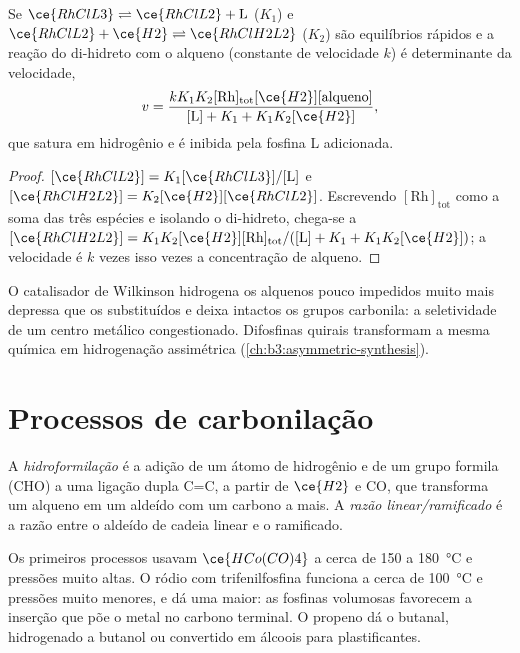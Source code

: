 \begin{proposition}\label{prop:b3:homogeneous-catalysis:wilkinson-rate}
Se $\ce{RhClL3} \rightleftharpoons \ce{RhClL2} + \mathrm L$ ($K_1$) e $\ce{RhClL2} + \ce{H2} \rightleftharpoons \ce{RhClH2L2}$ ($K_2$) são equilíbrios
rápidos e a reação do di-hidreto com o alqueno (constante de velocidade $k$)
é determinante da velocidade,
\[
  v = \frac{kK_1K_2[\mathrm{Rh}]_{\mathrm{tot}}[\ce{H2}][\text{alqueno}]}{[\mathrm L] + K_1 + K_1K_2[\ce{H2}]},
\]
que satura em hidrogênio e é inibida pela fosfina L adicionada.
\end{proposition}

\begin{proof}
$[\ce{RhClL2}] = K_1[\ce{RhClL3}]/[\mathrm L]$ e $[\ce{RhClH2L2}] = K_2[\ce{H2}][\ce{RhClL2}]$. Escrevendo $[\mathrm{Rh}]_{\mathrm{tot}}$ como a
soma das três espécies e isolando o di-hidreto, chega-se a
$[\ce{RhClH2L2}] =
K_1K_2[\ce{H2}][\mathrm{Rh}]_{\mathrm{tot}}/([\mathrm L] + K_1 + K_1K_2[\ce{H2}])$; a velocidade é $k$ vezes isso vezes a
concentração de alqueno.
\end{proof}

O catalisador de Wilkinson hidrogena os alquenos pouco impedidos muito mais depressa que os
substituídos e deixa intactos os grupos carbonila: a seletividade de um
centro metálico congestionado. Difosfinas quirais transformam a mesma química em
hidrogenação assimétrica (\cref{ch:b3:asymmetric-synthesis}).

\section{Processos de carbonilação}

\begin{definition}[Hidroformilação]\label{def:b3:homogeneous-catalysis:hydroformylation}
A \emph{hidroformilação} é a adição de um átomo de hidrogênio
e de um grupo formila (CHO) a uma ligação dupla C=C, a partir de $\ce{H2}$ e CO, que transforma um
alqueno em um aldeído com um carbono a mais. A \emph{razão
linear/ramificado} é a razão entre o aldeído
de cadeia linear e o ramificado.
\end{definition}

Os primeiros processos usavam $\ce{HCo(CO)4}$ a cerca de 150 a \qty{180}{\celsius} e pressões muito
altas. O ródio com trifenilfosfina funciona a cerca de \qty{100}{\celsius} e
pressões muito menores, e dá uma  maior: as fosfinas volumosas
favorecem a inserção que põe o metal no carbono terminal.
O propeno dá o butanal, hidrogenado a butanol ou convertido em álcoois
para plastificantes.

